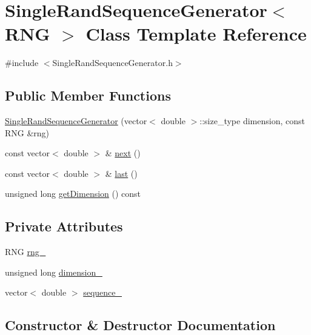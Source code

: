\hypertarget{class_single_rand_sequence_generator}{}\section{Single\+Rand\+Sequence\+Generator$<$ R\+NG $>$ Class Template Reference}
\label{class_single_rand_sequence_generator}


{\ttfamily \#include $<$Single\+Rand\+Sequence\+Generator.\+h$>$}

\subsection*{Public Member Functions}
\begin{DoxyCompactItemize}
\item 
\hyperlink{class_single_rand_sequence_generator_a978b64047fcb9ecedaee6b53faf08bf1}{Single\+Rand\+Sequence\+Generator} (vector$<$ double $>$\+::size\+\_\+type dimension, const R\+NG \&rng)
\item 
const vector$<$ double $>$ \& \hyperlink{class_single_rand_sequence_generator_abb6b9fa64903d30cea5c1e03e0b1ca58}{next} ()
\item 
const vector$<$ double $>$ \& \hyperlink{class_single_rand_sequence_generator_a55a7be74efb71301267ff5aaff8349a9}{last} ()
\item 
unsigned long \hyperlink{class_single_rand_sequence_generator_a36364446f579ca7e97b6e832eae5a4ad}{get\+Dimension} () const
\end{DoxyCompactItemize}
\subsection*{Private Attributes}
\begin{DoxyCompactItemize}
\item 
R\+NG \hyperlink{class_single_rand_sequence_generator_ae558374c172ea997e1d7d717fc7fe95e}{rng\+\_\+}
\item 
unsigned long \hyperlink{class_single_rand_sequence_generator_a9cc3a5a32282f4d6ef9e6ae838647e3e}{dimension\+\_\+}
\item 
vector$<$ double $>$ \hyperlink{class_single_rand_sequence_generator_af886df7f0afc0d33da3472558856f0a0}{sequence\+\_\+}
\end{DoxyCompactItemize}


\subsection{Constructor \& Destructor Documentation}
\hypertarget{class_single_rand_sequence_generator_a978b64047fcb9ecedaee6b53faf08bf1}{}\label{class_single_rand_sequence_generator_a978b64047fcb9ecedaee6b53faf08bf1} 
